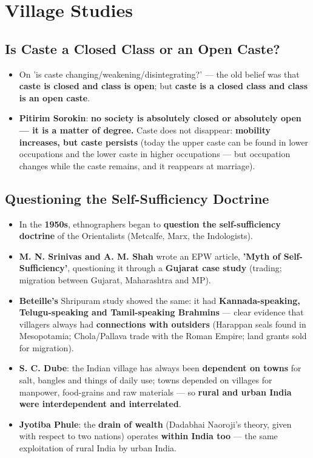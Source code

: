\chapter{Village Studies}

\section{Is Caste a Closed Class or an Open Caste?}

\begin{KeyConcept}
\begin{itemize}
\item On 'is caste changing/weakening/disintegrating?' --- the old belief was that \textbf{caste is closed and class is open}; but \textbf{caste is a closed class and class is an open caste}.
\item \textbf{Pitirim Sorokin}: \textbf{no society is absolutely closed or absolutely open --- it is a matter of degree.} Caste does not disappear: \textbf{mobility increases, but caste persists} (today the upper caste can be found in lower occupations and the lower caste in higher occupations --- but occupation changes while the caste remains, and it reappears at marriage).
\end{itemize}
\end{KeyConcept}

\section{Questioning the Self-Sufficiency Doctrine}

\begin{KeyConcept}
\begin{itemize}
\item In the \textbf{1950s}, ethnographers began to \textbf{question the self-sufficiency doctrine} of the Orientalists (Metcalfe, Marx, the Indologists).
\item \textbf{M. N. Srinivas and A. M. Shah} wrote an EPW article, \textbf{'Myth of Self-Sufficiency'}, questioning it through a \textbf{Gujarat case study} (trading; migration between Gujarat, Maharashtra and MP).
\item \textbf{Beteille's} Shripuram study showed the same: it had \textbf{Kannada-speaking, Telugu-speaking and Tamil-speaking Brahmins} --- clear evidence that villagers always had \textbf{connections with outsiders} (Harappan seals found in Mesopotamia; Chola/Pallava trade with the Roman Empire; land grants sold for migration).
\item \textbf{S. C. Dube}: the Indian village has always been \textbf{dependent on towns} for salt, bangles and things of daily use; towns depended on villages for manpower, food-grains and raw materials --- so \textbf{rural and urban India were interdependent and interrelated}.
\item \textbf{Jyotiba Phule}: the \textbf{drain of wealth} (Dadabhai Naoroji's theory, given with respect to two nations) operates \textbf{within India too} --- the same exploitation of rural India by urban India.
\end{itemize}
\end{KeyConcept}


